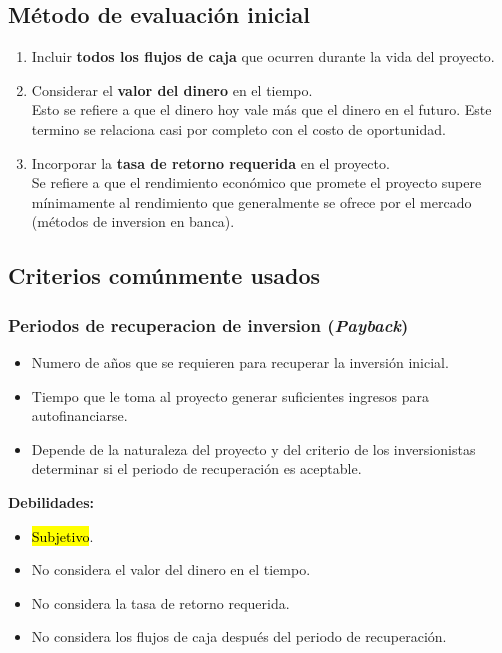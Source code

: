 \documentclass{templateNote}
\begin{document}
\subsection{Método de evaluación inicial}
\begin{enumerate}[label=\alph*)]
    \item Incluir \textbf{todos los flujos de caja} que ocurren durante la vida del proyecto.
    \begin{center}
    \end{center}
    \item Considerar el \textbf{valor del dinero} en el tiempo. \\
    Esto se refiere a que el dinero hoy vale más que el dinero en el futuro. Este termino se relaciona casi por completo con el costo de oportunidad.
    \item Incorporar la \textbf{tasa de retorno requerida} en el proyecto.\\
    Se refiere a que el rendimiento económico que promete el proyecto supere mínimamente al rendimiento que generalmente se ofrece por el mercado (métodos de inversion en banca).
\end{enumerate}

\subsection{Criterios comúnmente usados}

\subsubsection{Periodos de recuperacion de inversion (\textit{Payback})}
\begin{itemize}
    \item Numero de años que se requieren para recuperar la inversión inicial.
    \item Tiempo que le toma al proyecto generar suficientes ingresos para autofinanciarse.
    \item Depende de la naturaleza del proyecto y del criterio de los inversionistas determinar si el periodo de recuperación es aceptable. 
\end{itemize}
\textbf{Debilidades:}
\begin{itemize}
    \item \hl{Subjetivo}.
    \item No considera el valor del dinero en el tiempo.
    \item No considera la tasa de retorno requerida.
    \item No considera los flujos de caja después del periodo de recuperación.
\end{itemize}
\end{document}
